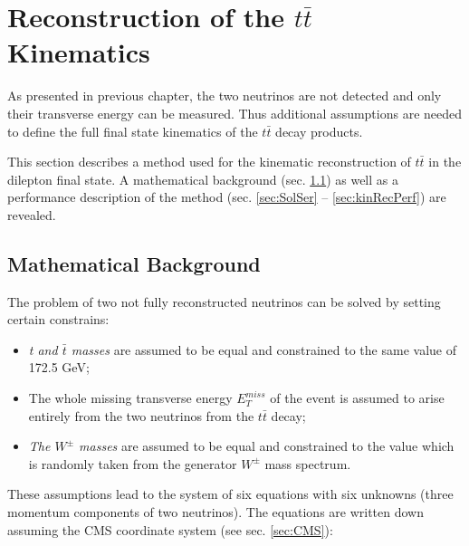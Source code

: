 \chapter{Reconstruction of the $t\bar{t}$ Kinematics}\label{chapt:kinReco}

As presented in previous chapter, the two neutrinos are not detected and only their transverse energy can be measured. Thus additional
assumptions are needed to define the full final state kinematics of the $t\bar{t}$ decay products.

This section describes a method used for the kinematic reconstruction of $t\bar{t}$ in the dilepton final state. A mathematical
background (sec. \ref{sec:MatBg}) as well as a performance description of the method (sec. \ref{sec:SolSer} -- \ref{sec:kinRecPerf}) are revealed.

\section{Mathematical Background}\label{sec:MatBg}

The problem of two not fully reconstructed neutrinos can be solved by setting certain constrains:

\begin{itemize}
 \item \textit{t and $\bar{t}$ masses} are assumed to be equal and constrained to the same value of 172.5 GeV\cite{PDG-2012};
 \item The whole missing transverse energy $E_{T}^{miss}$ of the event is assumed to arise entirely
 from the two neutrinos from the $t\bar{t}$ decay;
 \item \textit{The $W^{\pm}$ masses} are assumed to be equal and constrained to the value which is randomly taken
 from the generator $W^{\pm}$ mass spectrum.
\end{itemize}

These assumptions lead to the system of six equations with six unknowns (three momentum components of two neutrinos).
The equations are written down assuming the CMS coordinate system (see sec. \ref{sec:CMS}):

